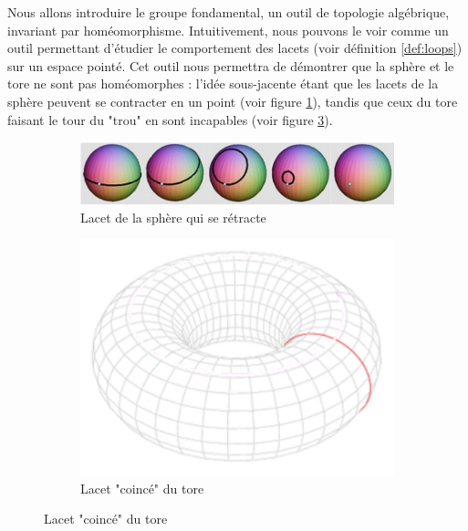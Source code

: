 Nous allons introduire le groupe fondamental, un outil de topologie algébrique, invariant par homéomorphisme. Intuitivement, nous pouvons le voir comme un outil permettant d'étudier le comportement des lacets (voir définition \ref{def:loops}) sur un espace pointé. Cet outil nous permettra de démontrer que la sphère et le tore ne sont pas homéomorphes : l'idée sous-jacente étant que les lacets de la sphère peuvent se contracter en un point (voir figure \ref{fig:lacet-sphere}), tandis que ceux du tore faisant le tour du "trou" en sont incapables (voir figure \ref{fig:lacet-tore}).

\begin{figure}[H]
\centering
\begin{subfigure}[c]{0.6\linewidth}
\centering
\includegraphics[width=0.7\linewidth]{pictures/sphere-intro.png}
\caption{Lacet de la sphère qui se rétracte}
\label{fig:lacet-sphere}
\end{subfigure}
\begin{subfigure}[c]{0.3\linewidth}
\centering
\includegraphics[width=0.7\linewidth]{pictures/tore-intro.png}
\caption{Lacet "coincé" du tore}
\label{fig:lacet-tore}
\end{subfigure}
\end{figure}

